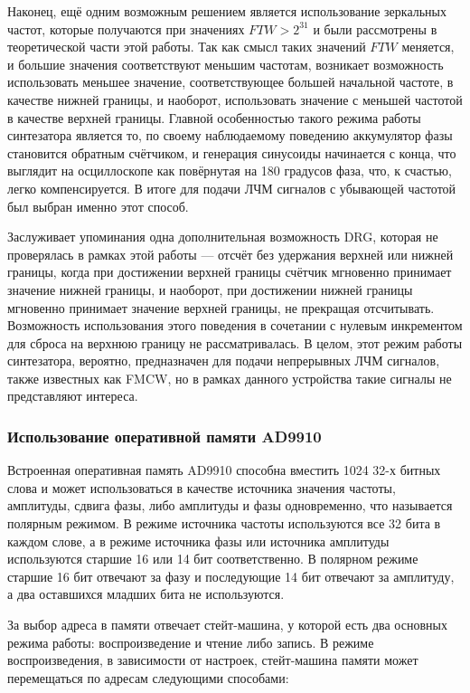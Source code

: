 \documentclass[rusmathsym, eqnumwithinsec, amspack, hyperref]{bomgost}
\begin{document}
Наконец, ещё одним возможным решением является использование зеркальных частот, которые получаются при значениях $FTW > 2^{31}$ и были рассмотрены в теоретической части этой работы. Так как смысл таких значений $FTW$ меняется, и большие значения соответствуют меньшим частотам, возникает возможность использовать меньшее значение, соответствующее большей начальной частоте, в качестве нижней границы, и наоборот, использовать значение с меньшей частотой в качестве верхней границы. Главной особенностью такого режима работы синтезатора является то, по своему наблюдаемому поведению аккумулятор фазы становится обратным счётчиком, и генерация синусоиды начинается с конца, что выглядит на осциллоскопе как повёрнутая на 180 градусов фаза, что, к счастью, легко компенсируется. В итоге для подачи ЛЧМ сигналов с убывающей частотой был выбран именно этот способ.

Заслуживает упоминания одна дополнительная возможность DRG, которая не проверялась в рамках этой работы --- отсчёт без удержания верхней или нижней границы, когда при достижении верхней границы счётчик мгновенно принимает значение нижней границы, и наоборот, при достижении нижней границы мгновенно принимает значение верхней границы, не прекращая отсчитывать. Возможность использования этого поведения в сочетании с нулевым инкрементом для сброса на верхнюю границу не рассматривалась. В целом, этот режим работы синтезатора, вероятно, предназначен для подачи непрерывных ЛЧМ сигналов, также известных как FMCW, но в рамках данного устройства такие сигналы не представляют интереса.


\subsubsection{Использование оперативной памяти AD9910}

Встроенная оперативная память AD9910 способна вместить 1024 32-х битных слова и может использоваться в качестве источника значения частоты, амплитуды, сдвига фазы, либо амплитуды и фазы одновременно, что называется полярным режимом. В режиме источника частоты используются все 32 бита в каждом слове, а в режиме источника фазы или источника амплитуды используются старшие 16 или 14 бит соответственно. В полярном режиме старшие 16 бит отвечают за фазу и последующие 14 бит отвечают за амплитуду, а два оставшихся младших бита не используются.

За выбор адреса в памяти отвечает стейт-машина, у которой есть два основных режима работы: воспроизведение и чтение либо запись. В режиме воспроизведения, в зависимости от настроек, стейт-машина памяти может перемещаться по адресам следующими способами:
\end{document}
